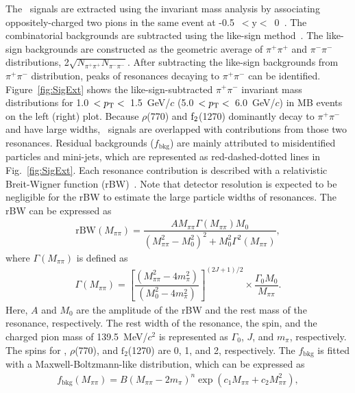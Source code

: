 The \fzero~signals are extracted using the invariant mass analysis by associating oppositely-charged two pions in the same event at -0.5~$<\mathrm{y}<$~0~\cite{ALICE:2013wgn}. The combinatorial backgrounds are subtracted using the like-sign method~\cite{PhysRevD.36.2019}. The like-sign backgrounds are constructed as the geometric average of $\pi^{+}\pi^{+}$ and $\pi^{-}\pi^{-}$ distributions,  2$\sqrt{N_{\pi^{+}\pi^{+}}N_{\pi^{-}\pi^{-}}}$. After subtracting the like-sign backgrounds from $\pi^{+}\pi^{-}$ distribution, peaks of resonances decaying to $\pi^{+}\pi^{-}$ can be identified. Figure~\ref{fig:SigExt} shows the like-sign-subtracted $\pi^{+}\pi^{-}$ invariant mass distributions for 1.0~$<p_{\rm{T}}<$~1.5~GeV/$c$ (5.0~$<p_{\rm{T}}<$~6.0~GeV/$c$) in MB events on the left (right) plot. Because $\rho$(770) and $\rm{f}_{2}$(1270) dominantly decay to $\pi^{+}\pi^{-}$ and have large widths, \fzero~signals are overlapped with contributions from those two resonances. Residual backgrounds ($f_{\mathrm{bkg}}$) are mainly attributed to misidentified particles and mini-jets, which are represented as red-dashed-dotted lines in Fig.~\ref{fig:SigExt}. Each resonance contribution is described with a relativistic Breit-Wigner function (rBW)~\cite{ALICE:2018qdv, ALICE:2022qnb}. Note that detector resolution is expected to be negligible for the rBW to estimate the large particle widths of resonances. The rBW can be expressed as
\begin{eqnarray}
\mathrm{rBW}(M_{\pi\pi}) = \dfrac{AM_{\pi\pi}\Gamma(M_{\pi\pi})M_{0}}{(M_{\pi\pi}^{2}-M_{0}^{2})^{2} + M_{0}^{2}\Gamma^{2}(M_{\pi\pi})},
\label{eq:rBW}
\end{eqnarray}
where $\Gamma(M_{\pi\pi})$ is defined as
\begin{eqnarray}
\Gamma(M_{\pi\pi}) = \left[ \dfrac{ (M_{\pi\pi}^{2} - 4m_{\pi}^{2}) }{ (M_{0}^{2}-4m_{\pi}^{2}) } \right]^{(2J+1)/2} \times \dfrac{\Gamma_{0}M_{0}}{M_{\pi\pi}} .
\label{eq:rBWW}
\end{eqnarray}
Here, $A$ and $M_{0}$ are the amplitude of the rBW and the rest mass of the resonance, respectively. The rest width of the resonance, the spin, and the charged pion mass of 139.5~MeV/$c^{2}$ is represented as $\Gamma_{0}$, $J$, and $m_{\pi}$, respectively. The spins for \fzero, $\rho$(770), and $\mathrm{f}_{2}$(1270) are 0, 1, and 2, respectively. The $f_{\mathrm{bkg}}$ is fitted with a Maxwell-Boltzmann-like distribution, which can be expressed as~\cite{OPAL:1998enc}
\begin{eqnarray}
f_{\mathrm{bkg}}(M_{\pi\pi}) = B(M_{\pi\pi}-2m_{\pi})^{n}\exp{(c_{1}M_{\pi\pi} + c_{2}M_{\pi\pi}^{2})},
\label{eq:bkg}
\end{eqnarray} 
